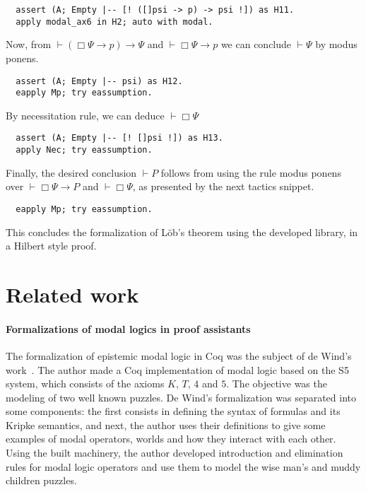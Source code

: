 \documentclass[3p,times]{elsarticle}
\begin{document}
\begin{verbatim}
  assert (A; Empty |-- [! ([]psi -> p) -> psi !]) as H11.
  apply modal_ax6 in H2; auto with modal.
\end{verbatim}

\noindent Now, from $\vdash (\Box\Psi \to p) \to \Psi$ and $\vdash \Box \Psi \to p$
we can conclude $\vdash \Psi$ by modus ponens.

\begin{verbatim}
  assert (A; Empty |-- psi) as H12.
  eapply Mp; try eassumption.
\end{verbatim}

\noindent By necessitation rule, we can deduce $\vdash \Box \Psi$

\begin{verbatim}
  assert (A; Empty |-- [! []psi !]) as H13.
  apply Nec; try eassumption.
\end{verbatim}

\noindent Finally, the desired conclusion $\vdash P$ follows from
using the rule modus ponens over $\vdash \Box \Psi \to P$
and $\vdash \Box \Psi$, as presented by the next tactics
snippet.

\begin{verbatim}
  eapply Mp; try eassumption.
\end{verbatim}

\noindent This concludes the formalization of L\"ob's theorem using
the developed library, in a Hilbert style proof.

\section{Related work}\label{sec:related}

\paragraph{Formalizations of modal logics in proof assistants}

The formalization of epistemic modal logic in Coq was the subject of de Wind's
work~\cite{dewind}.
The author made a Coq implementation of modal logic based on the S5 system,
which consists of  the axioms $K$, $T$, $4$ and $5$. The objective was the
modeling of two well known puzzles.
De Wind's formalization was separated into some components: the first consists in
defining the syntax of formulas and its Kripke semantics, and next, the author uses
their definitions to give some examples of modal operators, worlds and how they
interact with each other. Using the built machinery, the author developed
introduction and elimination rules for modal logic operators and use them to
model the wise man's and muddy children puzzles.
\end{document}
